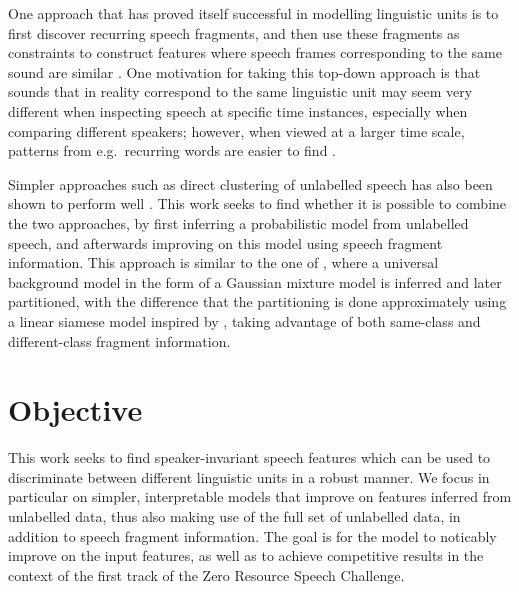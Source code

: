 One approach that has proved itself successful in modelling linguistic units is to first discover recurring speech fragments, and then use these fragments as constraints to construct features where speech frames corresponding to the same sound are similar \parencite{synnaeve2014phonetics,thiolliere2015hybrid}.
One motivation for taking this top-down approach is that sounds that in reality correspond to the same linguistic unit may seem very different when inspecting speech at specific time instances, especially when comparing different speakers; however, when viewed at a larger time scale, patterns from e.g.\ recurring words are easier to find \parencite{jansen2013weak}.

Simpler approaches such as direct clustering of unlabelled speech has also been shown to perform well \parencite{chen2015parallel}.
This work seeks to find whether it is possible to combine the two approaches, by first inferring a probabilistic model from unlabelled speech, and afterwards improving on this model using speech fragment information.
This approach is similar to the one of \textcite{jansen2013weak}, where a universal background model in the form of a Gaussian mixture model is inferred and later partitioned, with the difference that the partitioning is done approximately using a linear siamese model inspired by \textcite{synnaeve2014phonetics}, taking advantage of both same-class and different-class fragment information.

\section{Objective}
This work seeks to find speaker-invariant speech features which can be used to discriminate between different linguistic units in a robust manner.
We focus in particular on simpler, interpretable models that improve on features inferred from unlabelled data, thus also making use of the full set of unlabelled data, in addition to speech fragment information.
The goal is for the model to noticably improve on the input features, as well as to achieve competitive results in the context of the first track of the Zero Resource Speech Challenge.
